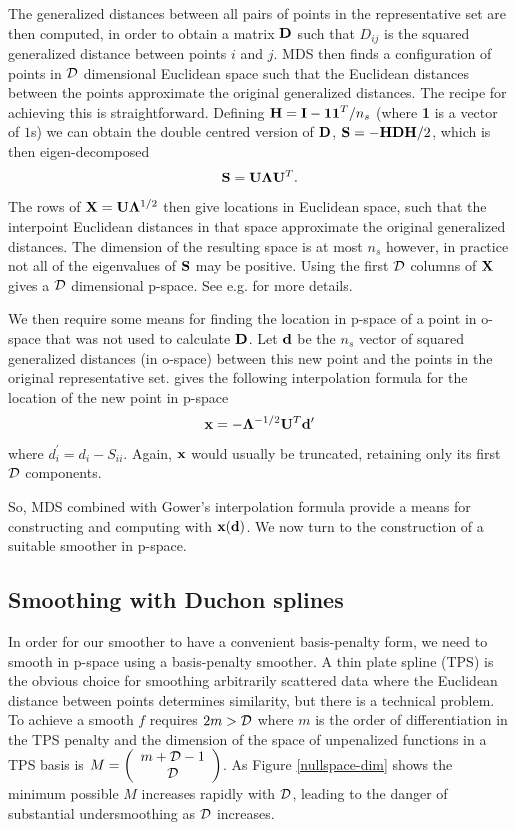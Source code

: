 \documentclass[smallextended]{svjour3}       %
\newcommand{\ts}{^T}
\begin{document}
The generalized distances between all pairs of points in the representative set are then computed, in order to obtain a matrix $\bf D$ such that $D_{ij}$ is the squared generalized distance between points $i$ and $j$. MDS then finds a configuration of points in $\cal D$ dimensional Euclidean space such that the Euclidean distances between the points approximate the original generalized distances. The recipe for achieving this is straightforward. Defining ${\bf H} = {\bf I} - {\bf 11}\ts/n_s$ (where {\bf 1} is a vector of $1$s) we can obtain the double centred version of ${\bf D}$, ${\bf S} = - {\bf HDH}/2$, which is then eigen-decomposed
$$
{\bf S} = {\bf U}{\bm \Lambda}{\bf U}\ts.
$$ 
The rows of  ${\bf X }= {\bf U}{\bm \Lambda}^{1/2}$ then give locations in Euclidean space, such that the interpoint Euclidean distances in that space approximate the original generalized distances. The dimension of the resulting space is at most $n_s$ however, in practice not all of the eigenvalues of ${\bf S}$ may be positive. Using the first $\cal D$ columns of $\bf X$ gives a $\cal D$ dimensional p-space. See e.g. \cite[Chapter 10]{chatfield1980introduction} for more details.

We then require some means for finding the location in p-space of a point in o-space that was not used to calculate $\bf D$. Let $\bf d$ be the $n_s$ vector of squared generalized distances (in o-space) between this new point and the points in the original representative set. \cite{Gower:1968to} gives the following interpolation formula for the location of the new point in p-space 
$$
{\bf x} = - {\bm \Lambda}^{-1/2} {\bf U}\ts {\bf d}^\prime
$$
where $d^\prime_i = d_i - S_{ii}$. Again, $\bf x$ would usually be truncated, retaining only its first $\cal D $ components. 

So, MDS combined with Gower's interpolation formula provide a means for constructing and computing with ${\bf x}({\bf d})$. We now turn to the construction of a suitable smoother in p-space.

\subsection{Smoothing with Duchon splines}
\label{ss:duchon}

In order for our smoother to have a convenient basis-penalty form, we need to smooth in p-space using a basis-penalty smoother. A thin plate spline (TPS) is the obvious choice for smoothing arbitrarily scattered data where the Euclidean distance between points determines similarity, but there is a technical problem. To achieve a smooth $f$ requires $2m > {\cal D}$ where $m$ is the order of differentiation in the TPS penalty and the dimension of the space of unpenalized functions in a TPS basis is $M = \left ( \begin{array}{c} m + {\cal D} - 1 \\ {\cal D} \end{array} \right )$. As Figure \ref{nullspace-dim} shows the minimum possible $M$ increases rapidly with $\cal D$, leading to the danger of substantial undersmoothing as $\cal D$ increases.
\end{document}
